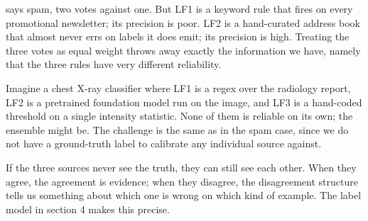 
 says spam, two votes against one. But LF1 is a keyword rule that fires on every promotional newsletter; its precision is poor. LF2 is a hand-curated address book that almost never errs on labels it does emit; its precision is high. Treating the three votes as equal weight throws away exactly the information we have, namely that the three rules have very different reliability.

 Imagine a chest X-ray classifier where LF1 is a regex over the radiology report, LF2 is a pretrained foundation model run on the image, and LF3 is a hand-coded threshold on a single intensity statistic. None of them is reliable on its own; the ensemble might be. The challenge is the same as in the spam case, since we do not have a ground-truth label to calibrate any individual source against.

 If the three sources never see the truth, they can still see each other. When they agree, the agreement is evidence; when they disagree, the disagreement structure tells us something about which one is wrong on which kind of example. The label model in section 4 makes this precise.

\begin{marginfigure}
\caption{The two ends of the supervision axis. Many cheap noisy votes from labelling functions sit at the bottom, a few expensive clean labels from the annotator sit at the top. Active learning chooses where to spend the few; weak supervision chooses how to combine the many.}
\label{fig:supervision_axis}
\end{marginfigure}

